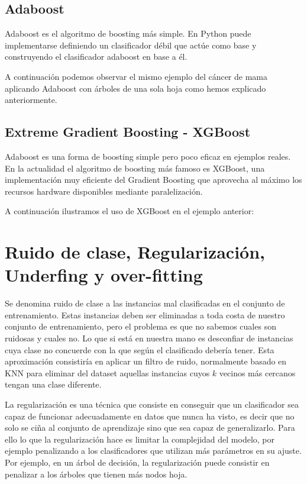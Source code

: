 \subsection{Adaboost}

Adaboost es el algoritmo de boosting más simple.  
En Python puede implementarse definiendo un clasificador débil que actúe como base y construyendo el clasificador adaboost en base a él.  

A continuación podemos observar el mismo ejemplo del cáncer de mama aplicando Adaboost con árboles de una sola hoja como hemos explicado anteriormente.

\subsection{Extreme Gradient Boosting - XGBoost}
Adaboost es una forma de boosting simple pero poco eficaz en ejemplos reales.  
En la actualidad el algoritmo de boosting más famoso es XGBoost, una implementación muy eficiente del Gradient Boosting que aprovecha al máximo los recursos hardware disponibles mediante paralelización.  

A continuación ilustramos el uso de XGBoost en el ejemplo anterior:

\section{Ruido de clase, Regularización, Underfing y over-fitting}
Se denomina ruido de clase a las instancias mal clasificadas en el conjunto de entrenamiento.
Estas instancias deben ser eliminadas a toda costa de nuestro conjunto de entrenamiento, pero el problema es que no sabemos cuales son ruidosas y cuales no.  
Lo que si está en nuestra mano es desconfiar de instancias cuya clase no concuerde con la que según el clasificado debería tener. Esta aproximación consistiría en aplicar un filtro de ruido, normalmente basado en KNN para eliminar del dataset aquellas instancias cuyos $k$ vecinos más cercanos tengan una clase diferente.  

La regularización es una técnica que consiste en conseguir que un clasificador sea capaz de funcionar adecuadamente en datos que nunca ha visto, es decir que no solo se ciña al conjunto de aprendizaje sino que sea capaz de generalizarlo.  
Para ello lo que la regularización hace es limitar la complejidad del modelo, por ejemplo penalizando a los clasificadores que utilizan más parámetros en su ajuste.  
Por ejemplo, en un árbol de decisión, la regularización puede consistir en penalizar a los árboles que tienen más nodos hoja.


